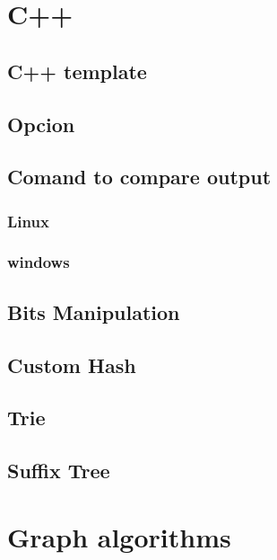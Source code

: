 \section{C++}
\subsection{C++ template}
\raggedbottom
\hrulefill
\subsection{Opcion}
\raggedbottom
\hrulefill
\subsection{Comand to compare output}
\subsubsection{Linux}
\raggedbottom
\subsubsection{windows}
\raggedbottom

\hrulefill
\subsection{Bits Manipulation}
\hrulefill

\subsection{Custom Hash}
\raggedbottom
\hrulefill
\subsection{Trie}
\raggedbottom
\hrulefill
\subsection{Suffix Tree}
\raggedbottom
\hrulefill

\section{Graph algorithms}
